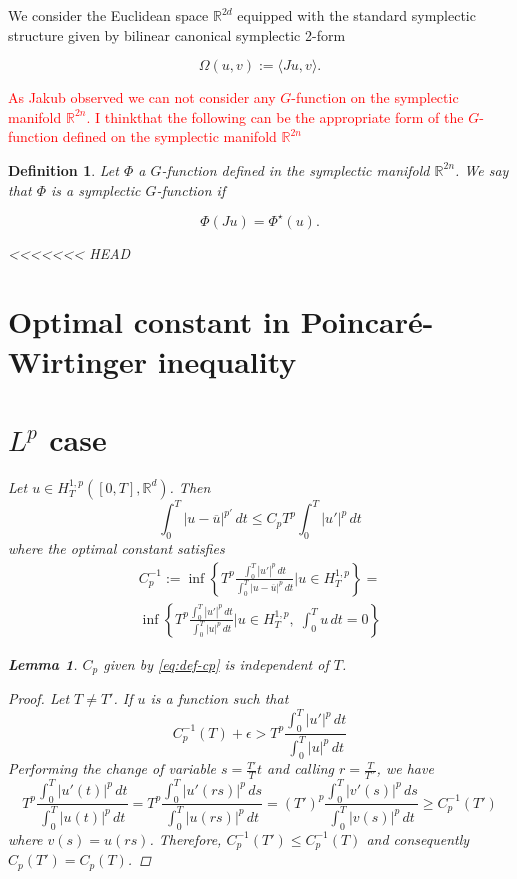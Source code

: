 \documentclass[twoside]{article}
\newtheorem{lem}[thm]{Lemma}
\newtheorem{defi}[thm]{Definition}
\theoremstyle{remark}
\newcommand{\rr}{\mathbb{R}}
\renewcommand{\leq}{\leqslant}
\renewcommand{\geq}{\geqslant}
\newcommand{\Phie}{\Phi^{\star}}
\begin{document}
We  consider the  Euclidean space $\rr^{2d}$ equipped with the standard  symplectic structure given by bilinear canonical symplectic 2-form

\[\Omega(u,v):=\langle Ju,v\rangle .\]

\textcolor{red}{As Jakub observed we can not consider any $G$-function on the symplectic manifold $\rr^{2n}$. I thinkthat the following can be the appropriate form of the $G$-function defined on the symplectic manifold $\rr^{2n}$}

\begin{defi}
 Let $\Phi$ a $G$-function defined in the symplectic manifold $\rr^{2n}$. We say that  $\Phi$ is a \emph{symplectic $G$-function} if

 \begin{equation}\label{eq:J-phi1}
 \Phi(Ju)= \Phie(u).
\end{equation}

<<<<<<< HEAD


\section{Optimal constant in Poincar\'e-Wirtinger inequality }


\section{$L^p$ case}
Let $u \in H^{1,p}_T ([0,T],\rr^d)$. Then
\begin{equation}
\int_0^T |u-\overline{u}|^{p'}\,dt\leq C_p T^p \int_0^T |u'|^p\,dt
\end{equation}
where the optimal constant satisfies
\begin{equation}\label{eq:def-cp}
\begin{split}
C_p^{-1}:=
\inf
\left\{
T^p \frac{\int_0^T |u'|^p\,dt}{\int_0^T |u-\overline{u}|^p\,dt}| u\in H^{1,p}_T
\right\}=
\\
\inf
\left\{
T^p \frac{\int_0^T |u'|^p\,dt}{\int_0^T |u|^p\,dt}| u\in H^{1,p}_T,\;\int_0^T u\,dt=0
\right\}
\end{split}
\end{equation}
 
\begin{lem}
$C_p$ given by \eqref{eq:def-cp} is independent of $T$.
\end{lem}

\begin{proof}
Let $T\neq T'$. If $u$  is a function such that 
\begin{equation}
C_p^{-1}(T)+\epsilon> T^p \frac{\int_0^T |u'|^p\,dt}{\int_0^T |u|^p\,dt}
\end{equation}  
Performing the change of variable $s=\frac{T'}{T}t$ and calling $r=\frac{T}{T´}$, we have
\begin{equation}
T^p \frac{\int_0^T |u'(t)|^p\,dt}{\int_0^T |u(t)|^p\,dt}=
T^p \frac{\int_0^T |u'(rs)|^p\,ds}{\int_0^T |u(rs)|^p\,dt}=
(T')^p \frac{\int_0^T |v'(s)|^p\,ds}{\int_0^T |v(s)|^p\,dt}\geq C_p^{-1}(T')
\end{equation}
where $v(s)=u(rs)$. Therefore, $C_p^{-1}(T')\leq C_p^{-1}(T)$ and consequently $C_p(T')=C_p(T)$.
\end{proof}


\end{defi}
\end{document}
